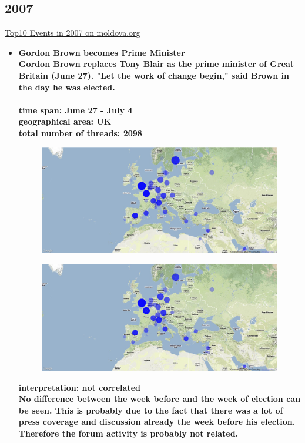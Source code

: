\documentclass[11pt,a4paper,english]{article}
\begin{document}
			\subsection{2007}
			\href{http://social.moldova.org/news/10-most-important-world-events-of-2007-217388-eng.html}{Top10 Events in 2007 on moldova.org}
				\begin{itemize}
					\item \bf Gordon Brown becomes Prime Minister \rm
						\\ Gordon Brown replaces Tony Blair as the prime minister of Great Britain (June 27). "Let the work of change begin," said Brown in the day he was elected.
						\\\\ \bf time span: \rm June 27 - July 4
						\\ \bf geographical area: \rm UK
						\\ \bf total number of threads: \rm 2098
						\begin{figure}[H]
							\vspace{-5pt}
  							\begin{center}
								\includegraphics[width=130mm]{img/pre-gordon}
							\end{center}
							\vspace{-13pt}
						\end{figure}
						\begin{figure}[H]
							\vspace{-13pt}
	  						\begin{center}
									\includegraphics[width=130mm]{img/post-gordon}
							\end{center}
							\vspace{-5pt}
						\end{figure}	
						\bf interpretation: \rm not correlated
						\\ No difference between the week before and the week of election can be seen. This is probably due to the fact that there was a lot of press coverage and discussion already the week before his election. Therefore the forum activity is probably not related.
						

\end{itemize}
\end{document}
